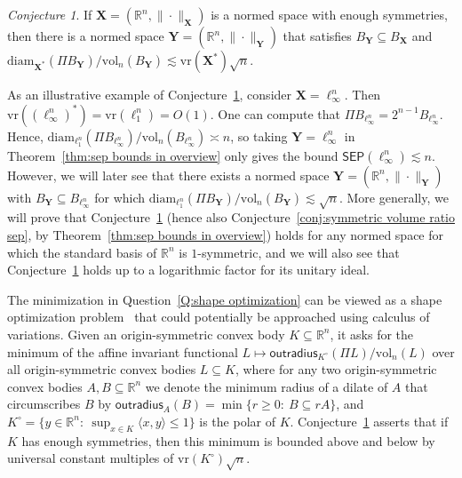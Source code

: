 \documentclass[11pt,reqno]{amsart}
\renewcommand{\le}{\leqslant}
\renewcommand{\ge}{\geqslant}
\newcommand{\diam}{\mathrm{diam}}
\newcommand{\vr}{\mathrm{vr}}
\newcommand{\X}{\mathbf X}
\newcommand{\Y}{\mathbf Y}
\newcommand{\R}{\mathbb R}
\theoremstyle{remark}
\newtheorem{conjecture}[theorem]{Conjecture}
\renewcommand{\subset}{\subseteq}
\newcommand{\vol}{\mathrm{vol}}
\renewcommand{\1}{\mathbf 1}
\newcommand{\sep}{\mathsf{SEP}}
\begin{document}
\begin{conjecture}\label{conj:affine invariant version} If  $\X=(\R^n,\|\cdot\|_\X)$ is a normed space with enough symmetries, then there is  a normed space $\Y=(\R^n,\|\cdot\|_\Y)$ that satisfies $B_\Y\subset B_\X$ and $\diam_{\X^{\textbf{*}}}(\Pi B_\Y)/\vol_n(B_{\Y})\lesssim \vr(\X^*)\sqrt{n}$.
\end{conjecture}








As an illustrative example of Conjecture~\ref{conj:affine invariant version}, consider $\X=\ell_\infty^n$. Then $\vr((\ell_\infty^n)^*)=\vr(\ell_1^n)=O(1)$. One can compute  that $\Pi B_{\ell_\infty^n}=2^{n-1} B_{\ell_\infty^n}$. Hence, $\diam_{\ell_1^n}(\Pi B_{\ell_\infty^n})/\vol_n(B_{\ell_\infty^n})\asymp n$, so taking $\Y=\ell_\infty^n$ in Theorem~\ref{thm:sep bounds in overview} only gives the bound $\sep(\ell_\infty^n)\lesssim n$. However, we will later see that there exists a normed space $\Y=(\R^n,\|\cdot\|_\Y)$ with $B_\Y\subset B_{\ell_\infty^n}$ for which $\diam_{\ell_1^n}(\Pi B_\Y)/\vol_n(B_\Y)\lesssim \sqrt{n}$. More generally, we will prove that Conjecture~\ref{conj:affine invariant version}  (hence also Conjecture~\ref{conj:symmetric volume ratio sep}, by Theorem~\ref{thm:sep bounds in overview}) holds for any normed space for which the standard basis of $\R^n$ is $1$-symmetric, and we will also see that Conjecture~\ref{conj:affine invariant version} holds up to a logarithmic factor for its unitary ideal.


The minimization in Question~\ref{Q:shape optimization} can be viewed as a shape optimization problem~\cite{HP18} that could potentially be approached using calculus of variations. Given an origin-symmetric convex body $K\subset \R^n$, it asks for  the minimum of the affine invariant functional $L\mapsto \mathsf{outradius}_{K^\circ}(\Pi L)/\vol_n(L)$ over all origin-symmetric convex bodies $L\subset K$, where for any two origin-symmetric convex bodies $A,B\subset \R^n$ we denote the minimum radius of a dilate of $A$ that circumscribes $B$ by $\mathsf{outradius}_A(B)=\min\{r\ge 0:\ B\subset rA\}$, and $K^\circ=\{y\in \R^n:\ \sup_{x\in K} \langle x,y\rangle\le 1\}$ is the polar of $K$. Conjecture~\ref{conj:affine invariant version} asserts that if $K$ has enough symmetries, then this minimum is bounded above and below by universal constant multiples of $\vr(K^\circ)\sqrt{n}$.
\end{document}
